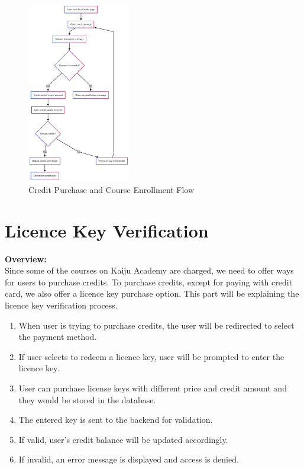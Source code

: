 \documentclass[a4paper, 11pt]{scrreprt}
\begin{document}
\begin{figure}[ht]
    \centering
    \includegraphics[width=0.4\textwidth]{img/credit_purchase_flow.png}
    \caption{Credit Purchase and Course Enrollment Flow}
\end{figure}

\section{Licence Key Verification}

\textbf{Overview:} \\
Since some of the courses on Kaiju Academy are charged, we need to offer ways for users to purchase credits. To purchase credits, except for paying with credit card, we also offer a licence key purchase option. This part will be explaining the licence key verification process.

\begin{enumerate}
    \item When user is trying to purchase credits, the user will be redirected to select the payment method.
    \item If user selects to redeem a licence key, user will be prompted to enter the licence key.
    \item User can purchase license keys with different price and credit amount and they would be stored in the database.
    \item The entered key is sent to the backend for validation.
    \item If valid, user's credit balance will be updated accordingly.
    \item If invalid, an error message is displayed and access is denied.
\end{enumerate}
\end{document}
